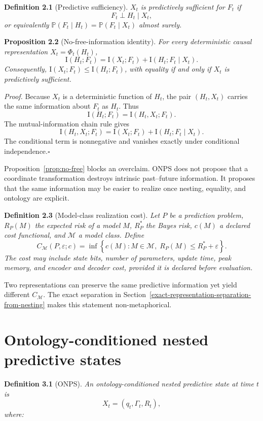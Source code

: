 \documentclass[11pt]{article}
\begin{document}
\textbf{Definition 2.1} (Predictive sufficiency). \emph{\(X_t\) is predictively sufficient for \(F_t\) if \[F_t\perp H_t\mid X_t,\] or equivalently \(\mathbb{P}(F_t\mid H_t)=\mathbb{P}(F_t\mid X_t)\) almost surely.}

\label{prop:no-free}
\textbf{Proposition 2.2} (No-free-information identity). \emph{For every deterministic causal representation \(X_t=\Phi_t(H_t)\), \[\mathrm{I}(H_t;F_t)=\mathrm{I}(X_t;F_t)+\mathrm{I}(H_t;F_t\mid X_t).\] Consequently, \(\mathrm{I}(X_t;F_t)\leq \mathrm{I}(H_t;F_t)\), with equality if and only if \(X_t\) is predictively sufficient.}

\emph{Proof.} Because \(X_t\) is a deterministic function of \(H_t\), the pair \((H_t,X_t)\) carries the same information about \(F_t\) as \(H_t\). Thus \[\mathrm{I}(H_t;F_t)=\mathrm{I}(H_t,X_t;F_t).\] The mutual-information chain rule gives \[\mathrm{I}(H_t,X_t;F_t)=\mathrm{I}(X_t;F_t)+\mathrm{I}(H_t;F_t\mid X_t).\] The conditional term is nonnegative and vanishes exactly under conditional independence.\hfill\(\square\)

Proposition~\ref{prop:no-free} blocks an overclaim. ONPS does not propose that a coordinate transformation destroys intrinsic past--future information. It proposes that the same information may be easier to realize once nesting, equality, and ontology are explicit.

\textbf{Definition 2.3} (Model-class realization cost). \emph{Let \(P\) be a prediction problem, \(R_P(M)\) the expected risk of a model \(M\), \(R_P^*\) the Bayes risk, \(c(M)\) a declared cost functional, and \(\mathcal{M}\) a model class. Define \[C_{\mathcal{M}}(P,\varepsilon;c)
=
\inf\left\{c(M): M\in\mathcal{M},\;R_P(M)\leq R_P^*+\varepsilon\right\}.\] The cost may include state bits, number of parameters, update time, peak memory, and encoder and decoder cost, provided it is declared before evaluation.}

Two representations can preserve the same predictive information yet yield different \(C_{\mathcal{M}}\). The exact separation in Section~\ref{exact-representation-separation-from-nesting} makes this statement non-metaphorical.

\section{Ontology-conditioned nested predictive states}\label{ontology-conditioned-nested-predictive-states}

\textbf{Definition 3.1} (ONPS). \emph{An ontology-conditioned nested predictive state at time \(t\) is \[X_t=(q_t,\Gamma_t,R_t),\] where:}
\end{document}

